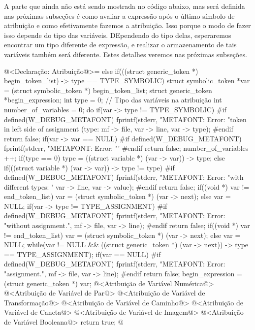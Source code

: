 A parte que ainda não está sendo mostrada no código abaixo, mas será
definida nas próximas subseções é como avaliar a expressão após o
último símbolo de atribuição e como efetivamente fazemos a
atribuição. Isso porque o modo de fazer isso depende do tipo das
variáveis. DEpendendo do tipo delas, esperaremos encontrar um tipo
diferente de expressão, e realizar o armazenamento de tais variáveis
também será diferente. Estes detalhes veremos nas próximas subseções.

\iniciocodigo
@<Declaração: Atribuição@>=
else if(((struct generic_token *) begin_token_list) -> type ==
        TYPE_SYMBOLIC){
  struct symbolic_token *var = (struct symbolic_token *) begin_token_list;
  struct generic_token *begin_expression;
  int type = 0; // Tipo das variáveis na atribuição
  int number_of_variables = 0;
  do{
    if(var -> type != TYPE_SYMBOLIC){
#if defined(W_DEBUG_METAFONT)
      fprintf(stderr, "METAFONT: Error: %
              "token in left side of assignment (type: %
              mf -> file,
              var -> line, var -> type);
#endif
      return false;
    }
    if(var -> var == NULL){
#if defined(W_DEBUG_METAFONT)
      fprintf(stderr, "METAFONT: Error: %
              "'%
#endif
      return false;
    }
    number_of_variables ++;
    if(type == 0)
      type = ((struct variable *) (var -> var)) -> type;
    else if(((struct variable *) (var -> var)) -> type != type){
#if defined(W_DEBUG_METAFONT)
      fprintf(stderr, "METAFONT: Error: %
              "with different types: '%
              var -> line, var -> value);
#endif
      return false;
    }
    if((void *) var != end_token_list)
      var = (struct symbolic_token *) (var -> next);
    else
      var = NULL;
    if(var -> type != TYPE_ASSIGNMENT){
#if defined(W_DEBUG_METAFONT)
      fprintf(stderr, "METAFONT: Error: %
              "without assignment.\n", mf -> file, var -> line);
#endif
      return false;
    }
    if((void *) var != end_token_list)
      var = (struct symbolic_token *) (var -> next);
    else
      var = NULL;
  } while(var != NULL &&
          ((struct generic_token *) (var -> next)) -> type ==
          TYPE_ASSIGNMENT);
  if(var == NULL){
#if defined(W_DEBUG_METAFONT)
      fprintf(stderr, "METAFONT: Error: %
              "assignment.\n", mf -> file, var -> line);
#endif
      return false;
  }
  begin_expression = (struct generic_token *) var;
  @<Atribuição de Variável Numérica@>
  @<Atribuição de Variável de Par@>
  @<Atribuição de Variável de Transformação@>
  @<Atribuição de Variável de Caminho@>
  @<Atribuição de Variável de Caneta@>
  @<Atribuição de Variável de Imagem@>
  @<Atribuição de Variável Booleana@>
  return true;
}
@
\fimcodigo

